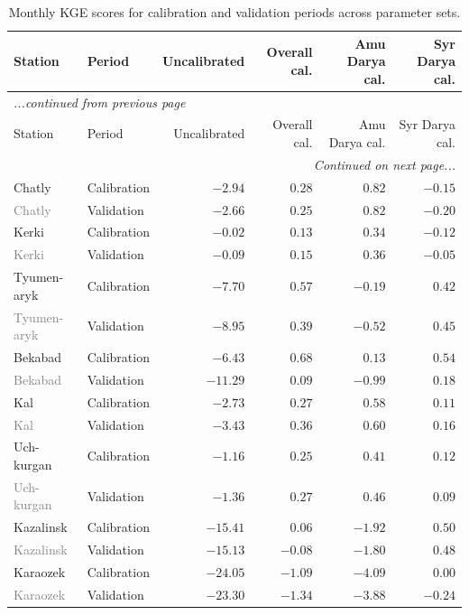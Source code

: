 \begin{longtable}{llrrrr}
\caption{Monthly KGE scores for calibration and validation periods across parameter sets.} \label{tab:kge_validation_appendix} \\
\toprule
Station & Period & Uncalibrated & Overall cal. & Amu Darya cal. & Syr Darya cal. \\
\midrule
\endfirsthead
\multicolumn{6}{l}{\textit{...continued from previous page}} \\
\toprule
Station & Period & Uncalibrated & Overall cal. & Amu Darya cal. & Syr Darya cal. \\
\midrule
\endhead
\midrule
\multicolumn{6}{r}{\textit{Continued on next page...}} \\
\endfoot
\bottomrule
\endlastfoot
Chatly & Calibration & $-2.94$ & $0.28$ & $0.82$ & $-0.15$ \\
\textcolor{gray}{Chatly} & Validation & $-2.66$ & $0.25$ & $0.82$ & $-0.20$ \\
\addlinespace
Kerki & Calibration & $-0.02$ & $0.13$ & $0.34$ & $-0.12$ \\
\textcolor{gray}{Kerki} & Validation & $-0.09$ & $0.15$ & $0.36$ & $-0.05$ \\
\addlinespace
Tyumen-aryk & Calibration & $-7.70$ & $0.57$ & $-0.19$ & $0.42$ \\
\textcolor{gray}{Tyumen-aryk} & Validation & $-8.95$ & $0.39$ & $-0.52$ & $0.45$ \\
\addlinespace
Bekabad & Calibration & $-6.43$ & $0.68$ & $0.13$ & $0.54$ \\
\textcolor{gray}{Bekabad} & Validation & $-11.29$ & $0.09$ & $-0.99$ & $0.18$ \\
\addlinespace
Kal & Calibration & $-2.73$ & $0.27$ & $0.58$ & $0.11$ \\
\textcolor{gray}{Kal} & Validation & $-3.43$ & $0.36$ & $0.60$ & $0.16$ \\
\addlinespace
Uch-kurgan & Calibration & $-1.16$ & $0.25$ & $0.41$ & $0.12$ \\
\textcolor{gray}{Uch-kurgan} & Validation & $-1.36$ & $0.27$ & $0.46$ & $0.09$ \\
\addlinespace
Kazalinsk & Calibration & $-15.41$ & $0.06$ & $-1.92$ & $0.50$ \\
\textcolor{gray}{Kazalinsk} & Validation & $-15.13$ & $-0.08$ & $-1.80$ & $0.48$ \\
\addlinespace
Karaozek & Calibration & $-24.05$ & $-1.09$ & $-4.09$ & $0.00$ \\
\textcolor{gray}{Karaozek} & Validation & $-23.30$ & $-1.34$ & $-3.88$ & $-0.24$ \\

\end{longtable}
